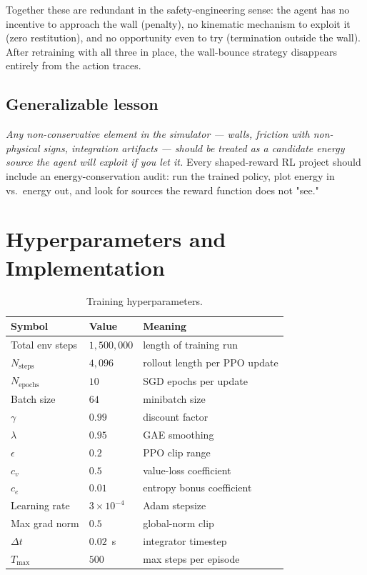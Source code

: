 \documentclass[11pt,a4paper]{article}
\begin{document}
\noindent Together these are redundant in the safety-engineering sense: the agent has no incentive to approach the wall (penalty), no kinematic mechanism to exploit it (zero restitution), and no opportunity even to try (termination outside the wall). After retraining with all three in place, the wall-bounce strategy disappears entirely from the action traces.

\subsection{Generalizable lesson}
\emph{Any non-conservative element in the simulator --- walls, friction with non-physical signs, integration artifacts --- should be treated as a candidate energy source the agent will exploit if you let it.} Every shaped-reward RL project should include an energy-conservation audit: run the trained policy, plot energy in vs.\ energy out, and look for sources the reward function does not "see."

\section{Hyperparameters and Implementation}

\begin{table}[h]
\centering
\caption{Training hyperparameters.}
\label{tab:hparams}
\begin{tabular}{lll}
\toprule
\textbf{Symbol} & \textbf{Value} & \textbf{Meaning} \\
\midrule
Total env steps  & $1{,}500{,}000$ & length of training run \\
$N_{\text{steps}}$ & $4{,}096$     & rollout length per PPO update \\
$N_{\text{epochs}}$ & $10$         & SGD epochs per update \\
Batch size       & $64$            & minibatch size \\
$\gamma$         & $0.99$          & discount factor \\
$\lambda$        & $0.95$          & GAE smoothing \\
$\epsilon$       & $0.2$           & PPO clip range \\
$c_v$            & $0.5$           & value-loss coefficient \\
$c_e$            & $0.01$          & entropy bonus coefficient \\
Learning rate    & $3\times10^{-4}$ & Adam stepsize \\
Max grad norm    & $0.5$           & global-norm clip \\
$\Delta t$       & $0.02$~s        & integrator timestep \\
$T_{\max}$       & $500$           & max steps per episode \\
\bottomrule
\end{tabular}
\end{table}
\end{document}
